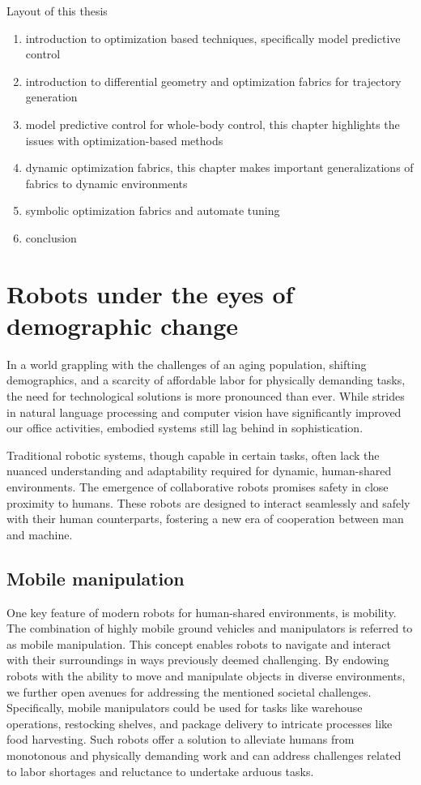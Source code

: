 Layout of this thesis
\begin{enumerate}
  \item introduction to optimization based techniques, specifically model
  predictive control
  \item introduction to differential geometry and optimization fabrics for
  trajectory generation
  \item model predictive control for whole-body control, this chapter highlights
  the issues with optimization-based methods
  \item dynamic optimization fabrics, this chapter makes important
  generalizations of fabrics to dynamic environments  
  \item symbolic optimization fabrics and automate tuning
  \item conclusion
\end{enumerate}
\fi

\section{Robots under the eyes of demographic change}

In a world grappling with the challenges of an aging population, shifting
demographics, and a scarcity of affordable labor for physically demanding tasks,
the need for technological solutions is more pronounced than ever. While
strides in natural language processing and computer vision have significantly
improved our office activities, embodied systems still
lag behind in sophistication.

Traditional robotic systems, though capable in certain tasks, often lack the
nuanced understanding and adaptability required for dynamic, human-shared
environments. The emergence of collaborative robots promises
safety in close proximity to humans. These robots are designed to interact
seamlessly and safely with their human counterparts, fostering a new era of
cooperation between man and machine. 

\subsection{Mobile manipulation}

One key feature of modern robots for human-shared
environments, is mobility. The combination of highly mobile
ground vehicles and manipulators is referred to as mobile
manipulation. This concept enables robots to navigate and
interact with their surroundings in ways previously deemed
challenging. By endowing robots with the ability to move and
manipulate objects in diverse environments, we further open
avenues for addressing the mentioned societal challenges.
Specifically, mobile manipulators could be used for tasks
like warehouse operations, restocking shelves, and package
delivery to intricate processes like food harvesting. Such
robots offer a solution to alleviate humans from monotonous
and physically demanding work and can address challenges
related to labor shortages and reluctance to undertake
arduous tasks.

